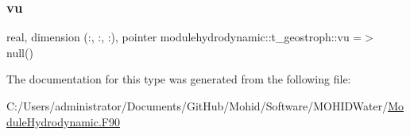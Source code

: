 \subsubsection{\texorpdfstring{vu}{vu}}
{\footnotesize\ttfamily real, dimension (\+:, \+:, \+:), pointer modulehydrodynamic\+::t\+\_\+geostroph\+::vu =$>$ null()\hspace{0.3cm}{\ttfamily [private]}}



The documentation for this type was generated from the following file\+:\begin{DoxyCompactItemize}
\item 
C\+:/\+Users/administrator/\+Documents/\+Git\+Hub/\+Mohid/\+Software/\+M\+O\+H\+I\+D\+Water/\mbox{\hyperlink{_module_hydrodynamic_8_f90}{Module\+Hydrodynamic.\+F90}}\end{DoxyCompactItemize}
